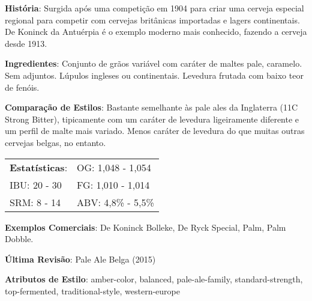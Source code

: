 \textbf{História}: Surgida após uma competição em 1904 para criar uma cerveja especial regional para competir com cervejas britânicas importadas e lagers continentais. De Koninck da Antuérpia é o exemplo moderno mais conhecido, fazendo a cerveja desde 1913.

\textbf{Ingredientes}: Conjunto de grãos variável com caráter de maltes pale, caramelo. Sem adjuntos. Lúpulos ingleses ou continentais. Levedura frutada com baixo teor de fenóis.

\textbf{Comparação de Estilos}: Bastante semelhante às pale ales da Inglaterra (11C Strong Bitter), tipicamente com um caráter de levedura ligeiramente diferente e um perfil de malte mais variado. Menos caráter de levedura do que muitas outras cervejas belgas, no entanto.

\begin{tabular}{@{}p{35mm}p{35mm}@{}}
  \textbf{Estatísticas}: & OG: 1,048 - 1,054 \\
  IBU: 20 - 30  & FG: 1,010 - 1,014  \\
  SRM: 8 - 14  & ABV: 4,8\% - 5,5\%
\end{tabular}

\textbf{Exemplos Comerciais}: De Koninck Bolleke, De Ryck Special, Palm, Palm Dobble.

\textbf{Última Revisão}: Pale Ale Belga (2015)

\textbf{Atributos de Estilo}: amber-color, balanced, pale-ale-family, standard-strength, top-fermented, traditional-style, western-europe